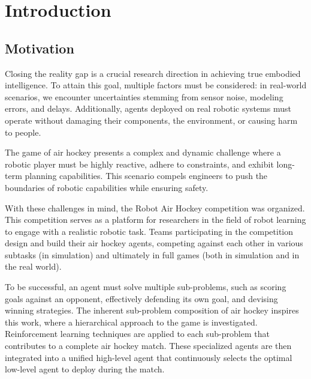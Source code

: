 \chapter*{Introduction}
\label{ch:Introduction}

\section*{Motivation}

Closing the reality gap is a crucial research direction in achieving true embodied intelligence. 
To attain this goal, multiple factors must be considered: in real-world scenarios, 
we encounter uncertainties stemming from sensor noise, modeling errors, and delays. 
Additionally, agents deployed on real robotic systems must operate without damaging their components, the environment, or causing harm to people.

The game of air hockey presents a complex and dynamic challenge where a robotic player must be highly reactive, 
adhere to constraints, and exhibit long-term planning capabilities. 
This scenario compels engineers to push the boundaries of robotic capabilities while ensuring safety.

With these challenges in mind, the Robot Air Hockey competition was organized. 
This competition serves as a platform for researchers in the field of robot learning to engage with a realistic robotic task. 
Teams participating in the competition design and build their air hockey agents, 
competing against each other in various subtasks (in simulation) and ultimately in full games (both in simulation and in the real world).

To be successful, an agent must solve multiple sub-problems, such as scoring goals against an opponent, 
effectively defending its own goal, and devising winning strategies. 
The inherent sub-problem composition of air hockey inspires this work, where a hierarchical approach to the game is investigated. 
Reinforcement learning techniques are applied to each sub-problem that contributes to a complete air hockey match. 
These specialized agents are then integrated into a unified high-level agent that continuously selects the optimal low-level agent to deploy during the match.

